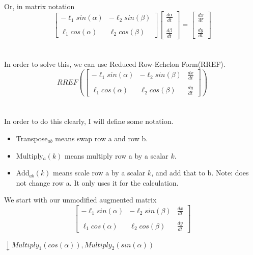 \documentclass{article}
\begin{document}
\\
Or, in matrix notation
\\
\begin{equation}
\begin{bmatrix}
-\ell_1sin(\alpha) & -\ell_2sin(\beta)\\\\
\ell_1cos(\alpha) & \ell_2cos(\beta)
\end{bmatrix}
\begin{bmatrix}
\frac{d\alpha}{dt}\\\\
\frac{d\beta}{dt}
\end{bmatrix}
=
\begin{bmatrix}
\frac{dx}{dt}\\\\
\frac{dy}{dt}
\end{bmatrix}
\end{equation}
\\
\\
In order to solve this, we can use Reduced Row-Echelon Form(RREF).
\begin{equation}
RREF(
\begin{bmatrix}
-\ell_1sin(\alpha) & -\ell_2sin(\beta) & \frac{dx}{dt}\\\\
\ell_1cos(\alpha) & \ell_2cos(\beta) & \frac{dy}{dt}
\end{bmatrix}
)
\end{equation}
\\
\\
In order to do this clearly, I will define some notation.
\begin{itemize}
\item Transpose$_{ab}$ 	means swap row a and row b.
\item Multiply$_a(k)$ 	means multiply row a by a scalar $k$.
\item Add$_{ab}(k)$ 	means scale row a by a scalar $k$, and add that to b.  Note: does not change row a.  It only uses it for the calculation.
\end{itemize}
We start with our unmodified augmented matrix
\\

\begin{equation*}
\begin{bmatrix}
-\ell_1sin(\alpha) & -\ell_2sin(\beta) & \frac{dx}{dt}\\\\
\ell_1cos(\alpha) & \ell_2cos(\beta) & \frac{dy}{dt}
\end{bmatrix}
\end{equation*}
\begin{center}
	\centering
	$\downarrow{Multiply_1(cos(\alpha)), Multiply_2(sin(\alpha))}$
\end{center}
\end{document}
